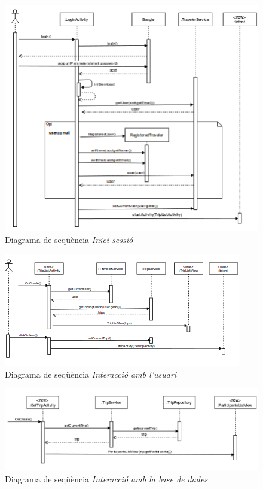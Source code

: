 \begin{figure}[!h]
\centering
\includegraphics[scale=1.2]{Figures/logInDS.png}
\caption{Diagrama de seqüència \textit{Inici sessió}}
\end{figure}

\begin{figure}[!h]
\centering
\includegraphics[scale=1.2]{Figures/tripListDS.png}
\caption{Diagrama de seqüència \textit{Interacció amb l'usuari}}
\end{figure}

\begin{figure}[!h]
\centering
\includegraphics[scale=1.2]{Figures/accesBDDS.png}
\caption{Diagrama de seqüència \textit{Interacció amb la base de dades}}
\end{figure}

